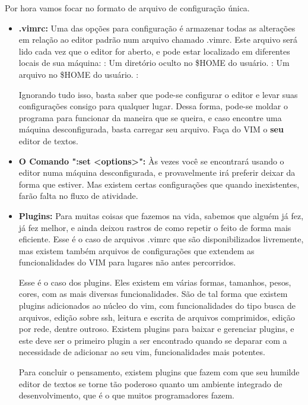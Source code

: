 \documentclass[a4paper, 12pt]{article}
\begin{document}
Por hora vamos focar no formato de arquivo de configuração única.

\begin{itemize}
    \item \textbf{.vimrc:}
        Uma das opções para configuração é armazenar todas as alterações em relação ao editor padrão num arquivo chamado .vimrc.
        Este arquivo será lido cada vez que o editor for aberto, e pode estar localizado em diferentes locais de sua máquina:
        : Um diretório oculto no \$HOME do usuário.
        : Um arquivo no \$HOME do usuário.
        : 

        Ignorando tudo isso, basta saber que pode-se configurar o editor e levar suas configurações consigo para qualquer lugar.
        Dessa forma, pode-se moldar o programa para funcionar da maneira que se queira, e caso encontre uma máquina desconfigurada, basta carregar seu arquivo.
        Faça do VIM o \textbf{seu} editor de textos.

    \item \textbf{O Comando ":set <options>":}
        Às vezes você se encontrará usando o editor numa máquina desconfigurada, e provavelmente irá preferir deixar da forma que estiver.
        Mas existem certas configurações que quando inexistentes, farão falta no fluxo de atividade.

    \item \textbf{Plugins:}
        Para muitas coisas que fazemos na vida, sabemos que alguém já fez, já fez melhor, e ainda deixou rastros de como repetir o feito de forma mais eficiente.
        Esse é o caso de arquivos .vimrc que são disponibilizados livremente, mas existem também arquivos de configurações que extendem as funcionalidades do VIM para lugares não antes percorridos.

        Esse é o caso dos plugins. Eles existem em várias formas, tamanhos, pesos, cores, com as mais diversas funcionalidades.
        São de tal forma que existem plugins adicionados ao núcleo do vim, com funcionalidades do tipo busca de arquivos, edição sobre ssh, leitura e escrita de arquivos comprimidos, edição por rede, dentre outroso. 
        Existem plugins para baixar e gerenciar plugins, e este deve ser o primeiro plugin a ser encontrado quando se deparar com a necessidade de adicionar ao seu vim, funcionalidades mais potentes.

        Para concluir o pensamento, existem plugins que fazem com que seu humilde editor de textos se torne tão poderoso quanto um ambiente integrado de desenvolvimento, que é o que muitos programadores fazem.
\end{itemize}
\end{document}
